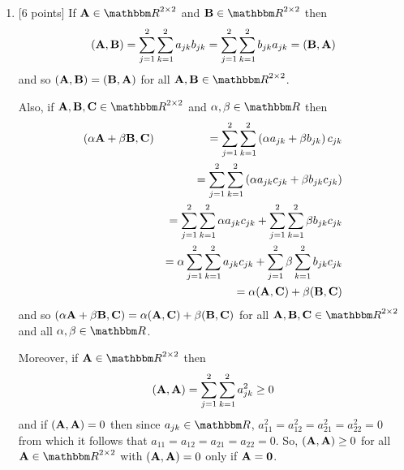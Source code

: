\begin{solution}
\begin{enumerate}
\item {[6 points]} If $\BA\in\R^{2\times2}$ and $\BB\in\R^{2\times2}$ then
\[
({\bf A},{\bf B})=\sum_{j=1}^2 \sum_{k=1}^2 a_{jk} b_{jk}=\sum_{j=1}^2 \sum_{k=1}^2 b_{jk} a_{jk}=({\bf B},{\bf A})
\]
and so $({\bf A},{\bf B})=({\bf B},{\bf A})$ for all $\BA,\BB\in\R^{2\times2}$.

Also, if $\BA,\BB,\BC\in\R^{2\times2}$ and $\alpha,\beta\in\R$ then
\begin{eqnarray*}
(\alpha{\bf A}+\beta{\bf B},{\bf C})&&=\sum_{j=1}^2 \sum_{k=1}^2 \left(\alpha a_{jk}+\beta b_{jk}\right)c_{jk}
\\
&&=\sum_{j=1}^2 \sum_{k=1}^2 \left(\alpha a_{jk}c_{jk}+\beta b_{jk}c_{jk}\right)
\\
&&=\sum_{j=1}^2 \sum_{k=1}^2 \alpha a_{jk}c_{jk}+\sum_{j=1}^2 \sum_{k=1}^2\beta b_{jk}c_{jk}
\\
&&=\alpha \sum_{j=1}^2 \sum_{k=1}^2 a_{jk}c_{jk}+\sum_{j=1}^2 \beta \sum_{k=1}^2b_{jk}c_{jk}
\\
&&=\alpha({\bf A},{\bf C})+\beta({\bf B},{\bf C})
\end{eqnarray*}
and so $(\alpha{\bf A}+\beta{\bf B},{\bf C})=\alpha({\bf A},{\bf C})+\beta({\bf B},{\bf C})$ for all $\BA,\BB,\BC\in\R^{2\times2}$ and all $\alpha,\beta\in\R$.

Moreover, if $\BA\in\R^{2\times2}$ then
\[
({\bf A},{\bf A})=\sum_{j=1}^2 \sum_{k=1}^2 a_{jk}^2\ge 0
\]
and if $({\bf A},{\bf A})=0$ then since $a_{jk}\in\R$, $a_{11}^2=a_{12}^2=a_{21}^2=a_{22}^2=0$ from which it follows that $a_{11}=a_{12}=a_{21}=a_{22}=0$. So, $({\bf A},{\bf A})\ge0$ for all $\BA\in\R^{2\times2}$ with $({\bf A},{\bf A})=0$ only if ${\bf A}={\bf 0}$.


\end{enumerate}
\end{solution}
